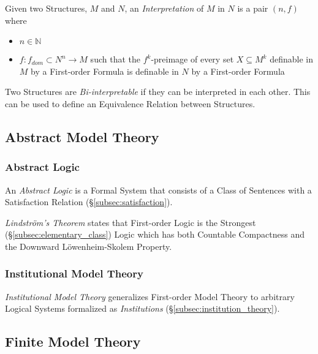 \documentclass{article}
\begin{document}
Given two Structures, $M$ and $N$, an \emph{Interpretation} of $M$ in
$N$ is a pair $(n,f)$ where
\begin{itemize}
    \item $n \in \mathbb{N}$
    \item $f:f_{dom} \subset N^n \rightarrow M$ such that the
      $f^k$-preimage of every set $X \subseteq M^k$ definable in $M$
      by a First-order Formula is definable in $N$ by a First-order
      Formula
\end{itemize}

Two Structures are \emph{Bi-interpretable} if they can be interpreted
in each other. This can be used to define an Equivalence Relation
between Structures.

\subsection{Abstract Model Theory}

\subsubsection{Abstract Logic}

An \emph{Abstract Logic} is a Formal System that consists of a Class
of Sentences with a Satisfaction Relation
(\S\ref{subsec:satisfaction}).

\emph{Lindstr\"om's Theorem} states that First-order Logic is the
Strongest (\S\ref{subsec:elementary_class}) Logic which has both
Countable Compactness and the Downward L\"owenheim-Skolem Property.

\subsubsection{Institutional Model Theory}

\emph{Institutional Model Theory} generalizes First-order Model Theory
to arbitrary Logical Systems formalized as \emph{Institutions}
(\S\ref{subsec:institution_theory}).

\subsection{Finite Model Theory}
\end{document}

